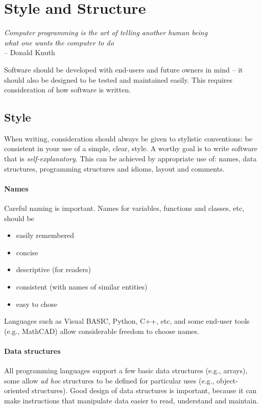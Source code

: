 \section{Style and Structure}
\begin{flushright}
\textit{Computer programming is the art of telling another human being\\%
what one wants the computer to do} \\
-- Donald Knuth 
\end{flushright}


Software should be developed with end-users and future owners in mind – it should also be designed to be tested and maintained easily. This requires consideration of how software is written.

\subsection{Style}
When writing, consideration should always be given to stylistic conventions: be consistent in your use of a simple, clear, style. A worthy goal is to write software that is \textit{self-explanatory}. This can be achieved by appropriate use of: names, data structures, programming structures and idioms, layout and comments. 

\paragraph{Names}
Careful naming is important. Names for variables, functions and classes, etc, should be
\begin{itemize}
\item easily remembered
\item concise
\item descriptive (for readers)
\item consistent (with names of similar entities)
\item easy to chose 
\end{itemize} 

Languages such as Visual BASIC, Python, C++, etc, and some end-user tools (e.g., MathCAD) allow considerable freedom to choose names. 

\paragraph{Data structures} All programming languages support a few basic data structures (e.g., arrays), some allow \textit{ad hoc} structures to be defined for particular uses (e.g., object-oriented structures). Good design of data structures is important, because it can make instructions that manipulate data easier to read, understand and maintain.

